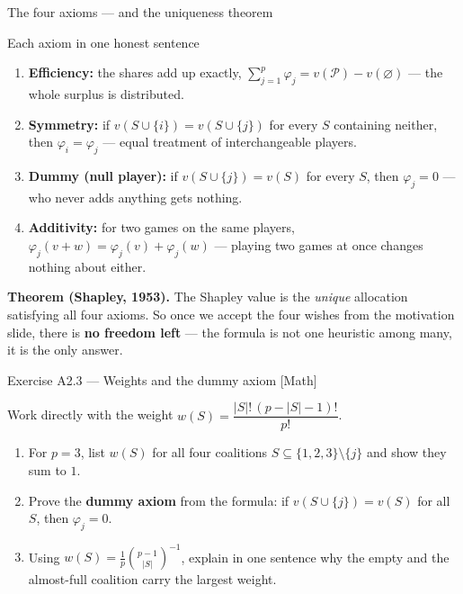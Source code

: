 \documentclass[aspectratio=169,11pt]{beamer}
\begin{document}
\begin{frame}{The four axioms --- and the uniqueness theorem}
  \footnotesize
  \begin{block}{Each axiom in one honest sentence}
    \begin{enumerate}
      \item \textbf{Efficiency:} the shares add up exactly,
            $\sum_{j=1}^{p}\varphi_j = v(\mathcal{P})-v(\varnothing)$ ---
            the whole surplus is distributed.
      \item \textbf{Symmetry:} if $v(S\cup\{i\})=v(S\cup\{j\})$ for every $S$
            containing neither, then $\varphi_i=\varphi_j$ --- equal treatment of
            interchangeable players.
      \item \textbf{Dummy (null player):} if $v(S\cup\{j\})=v(S)$ for every $S$,
            then $\varphi_j=0$ --- who never adds anything gets nothing.
      \item \textbf{Additivity:} for two games on the same players,
            $\varphi_j(v+w)=\varphi_j(v)+\varphi_j(w)$ --- playing two games at
            once changes nothing about either.
    \end{enumerate}
  \end{block}
  \begin{takeaway}
    \textbf{Theorem (Shapley, 1953).} The Shapley value is the \emph{unique}
    allocation satisfying all four axioms. So once we accept the four wishes from
    the motivation slide, there is \textbf{no freedom left} --- the formula is not one
    heuristic among many, it is the only answer.
  \end{takeaway}
\end{frame}

\begin{frame}{Exercise A2.3 --- Weights and the dummy axiom [Math]}
\begin{exercise}
  Work directly with the weight $w(S) = \dfrac{|S|!\,(p-|S|-1)!}{p!}$.
  \begin{enumerate}
    \item For $p=3$, list $w(S)$ for all four coalitions
          $S\subseteq\{1,2,3\}\setminus\{j\}$ and show they sum to $1$.
    \item Prove the \textbf{dummy axiom} from the formula: if
          $v(S\cup\{j\})=v(S)$ for all $S$, then $\varphi_j=0$.
    \item Using $w(S)=\frac1p\binom{p-1}{|S|}^{-1}$, explain in one sentence why
          the empty and the almost-full coalition carry the largest weight.
  \end{enumerate}
\end{exercise}
\end{frame}
\end{document}

